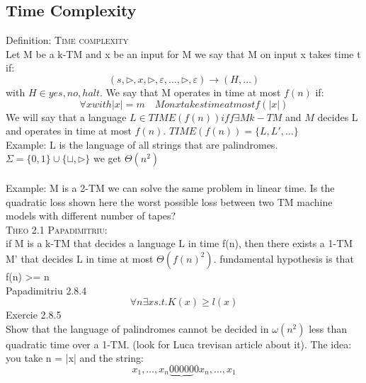\subsection*{Time Complexity}
Definition: \textsc{Time complexity}\\
Let M be a k-TM and x be an input for M we say that M on input x takes time t if: \[ 
    (s, \triangleright, x, \triangleright, \varepsilon, \ldots, \triangleright, \varepsilon) \longrightarrow ( H,\ldots) 
\] with $ H \in {yes, no, halt} $. We say that M operates in time at most $ f(n) $ if: \[ 
    \forall x with |x| = m \quad M on x takes time at most f(|x|) 
\]
We will say that a language $ L \in TIME(f(n)) iff \exists M k-TM$ and $M$ decides L and operates in time at most $f(n)$. $TIME(f(n)) = \{L, L', \ldots\} $\\
Example: L is the language of all strings that are palindromes. $ \Sigma = \{0,1\}\cup\{\sqcup, \triangleright\} $ we get $ \Theta(n^2) $\\\\
Example: M is a 2-TM we can solve the same problem in linear time. Is the quadratic loss shown here the worst possible loss between two TM machine models with different number of tapes?\\
\textsc{Theo 2.1 Papadimitriu}:\\
if M is a k-TM that decides a language L in time f(n), then there exists a 1-TM M' that decides L in time at most $ \Theta(f(n)^2) $. fundamental hypothesis is that f(n) >= n
\\
Papadimitriu 2.8.4
\[ 
    \forall n \exists x s.t. K(x) \geq l(x)
\]
Exercie 2.8.5\\
Show that the language of palindromes cannot be decided in $ \omega(n^2) $  less than quadratic time over a 1-TM. (look for Luca trevisan article about it). The idea: you take n = |x| and the string:
\[ 
    x_{1}, \ldots,x_{n}\underbrace{00000}{0}x_{n}, \ldots,x_{1}
\]
